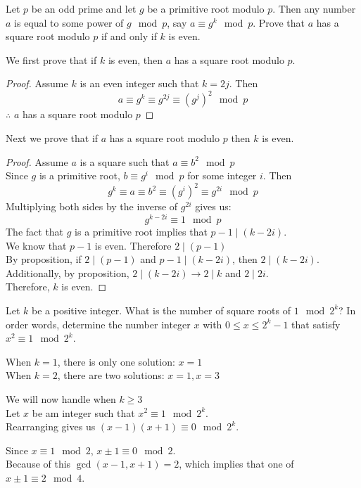 \documentclass[12pt]{article}
\begin{document}
\newpage
\problem Let $p$ be an odd prime and let $g$ be a primitive root modulo $p$. Then any number $a$ is equal to some power of $g\mod{p}$, say $a\equiv g^k\mod{p}$. Prove that $a$ has a square root modulo $p$ if and only if $k$ is even.

\solution
We first prove that if $k$ is even, then $a$ has a square root modulo $p$.
\begin{proof}
    Assume $k$ is an even integer such that $k=2j$. Then
    \[a\equiv g^k\equiv g^{2j}\equiv (g^j)^2\mod{p}\]
    $\therefore$ $a$ has a square root modulo $p$
\end{proof}

\noindent
Next we prove that if $a$ has a square root modulo $p$ then $k$ is even.
\begin{proof}
    Assume $a$ is a square such that $a\equiv b^2\mod{p}$\\
    Since $g$ is a primitive root, $b\equiv g^i\mod{p}$ for some integer $i$. Then
    \[g^k\equiv a\equiv b^2\equiv (g^i)^2\equiv g^{2i}\mod{p}\]
    Multiplying both sides by the inverse of $g^{2i}$ gives us:
    \[g^{k-2i}\equiv 1\mod{p}\]
    The fact that $g$ is a primitive root implies that $p-1\mid(k-2i)$.\\
    We know that $p-1$ is even. Therefore $2\mid(p-1)$\\
    By proposition, if $2\mid(p-1)$ and $p-1\mid(k-2i)$, then $2\mid(k-2i)$.\\
    Additionally, by proposition, $2\mid(k-2i)\rightarrow 2\mid k$ and $2\mid 2i$.\\
    Therefore, $k$ is even.
\end{proof}

\newpage
\problem Let $k$ be a positive integer. What is the number of square roots of $1\mod{2^k}$? In order words, determine the number integer $x$ with $0\leq x\leq 2^k-1$ that satisfy $x^2\equiv 1\mod{2^k}$.

\solution
When $k=1$, there is only one solution: $x=1$\\
When $k=2$, there are two solutions: $x=1,x=3$

\noindent
We will now handle when $k\geq3$\\
Let $x$ be am integer such that $x^2\equiv1\mod{2^k}$.\\
Rearranging gives us $(x-1)(x+1)\equiv0\mod{2^k}$.

\noindent
Since $x\equiv1\mod{2}$, $x\pm1\equiv0\mod{2}$.\\
Because of this $\gcd(x-1,x+1)=2$, which implies that one of $x\pm1\equiv2\mod{4}$.
\end{document}
